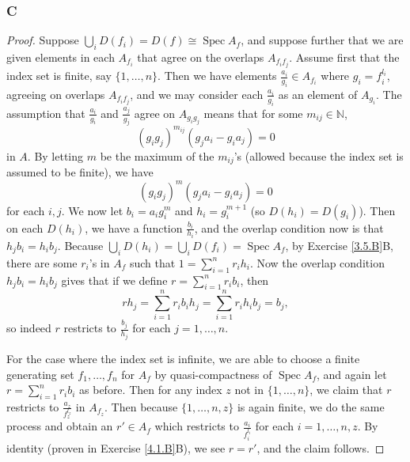 \documentclass{article}
\newcommand{\N}{\mathbb{N}}
\DeclareMathOperator{\Spec}{\mathrm{Spec}}
\begin{document}
\subsubsection{C}\label{4.1.C}
\begin{proof}
    Suppose $\bigcup_i D(f_i) = D(f)\cong \Spec A_f$, and suppose further that we are given elements in each $A_{f_i}$ that agree on the overlaps $A_{f_i f_j}$. Assume first that the index set is finite, say $\{1, \dots, n\}$. Then we have elements $\frac{a_i}{g_i}\in A_{f_i}$ where $g_i=f_i^{l_i}$, agreeing on overlaps $A_{f_if_j}$, and we may consider each $\frac{a_i}{g_i}$ as an element of $A_{g_i}$. The assumption that $\frac{a_i}{g_i}$ and $\frac{a_j}{g_j}$ agree on $A_{g_ig_j}$ means that for some $m_{ij}\in \N$, $$(g_ig_j)^{m_{ij}}(g_j a_i - g_i a_j)=0$$ in $A$. By letting $m$ be the maximum of the $m_{ij}$'s (allowed because the index set is assumed to be finite), we have
    \[
    (g_i g_j)^m (g_j a_i - g_i a_j)=0
    \]
    for each $i,j$. We now let $b_i = a_i g_i^m$ and $h_i = g_i ^{m+1}$ (so $D(h_i)=D(g_i)$). Then on each $D(h_i)$, we have a function $\frac{b_i}{h_i}$, and the overlap condition now is that $h_j b_i = h_i b_j$. Because $\bigcup_i D(h_i)=\bigcup_i D(f_i)=\Spec A_f$, by Exercise \ref{3.5.B}B,
    there are some $r_i$'s in $A_f$ such that $1=\sum_{i=1}^n r_i h_i$. Now the overlap condition $h_jb_i=h_i b_j$ gives that if we define $r=\sum_{i=1}^n r_i b_i$, then
    \[
    rh_j = \sum_{i=1}^n r_i b_i h_j = \sum_{i=1}^n r_i h_i b_j = b_j,
    \]
    so indeed $r$ restricts to $\frac{b_j}{h_j}$ for each $j=1, \dots, n$.

    For the case where the index set is infinite, we are able to choose a finite generating set $f_1, \dots, f_n$ for $A_f$ by quasi-compactness of $\Spec A_f$, and again let $r=\sum_{i=1}^n r_i b_i$ as before. Then for any index $z$ not in $\{1, \dots, n\}$, we claim that $r$ restricts to $\frac{a_z}{f_z^{l_z}}$ in $A_{f_z}$. Then because $\{1, \dots, n , z\}$ is again finite, we do the same process and obtain an $r'\in A_f$ which restricts to $\frac{a_i}{f_i^{l_i}}$ for each $i=1, \dots, n, z$. By identity (proven in Exercise \ref{4.1.B}B), we see $r=r'$, and the claim follows.
\end{proof}
\end{document}
